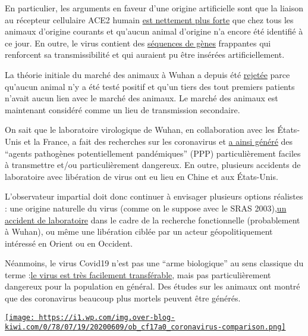 En particulier, les arguments en faveur d'une origine artificielle sont
que la liaison au récepteur cellulaire ACE2 humain
\href{https://arxiv.org/abs/2005.06199}{est nettement plus forte} que
chez tous les animaux d'origine courants et qu'aucun animal d'origine
n'a encore été identifié à ce jour. En outre, le virus contient des
\href{https://gmwatch.org/en/news/latest-news/19403-wuhan-and-us-scientists-used-undetectable-methods-of-genetic-engineering-on-bat-coronaviruses}{séquences
de gènes} frappantes qui renforcent sa transmissibilité et qui auraient
pu être insérées artificiellement.

La théorie initiale du marché des animaux à Wuhan a depuis été
\href{https://thebulletin.org/2020/06/did-the-sars-cov-2-virus-arise-from-a-bat-coronavirus-research-program-in-a-chinese-laboratory-very-possibly}{rejetée}
parce qu'aucun animal n'y a été testé positif et qu'un tiers des tout
premiers patients n'avait aucun lien avec le marché des animaux. Le
marché des animaux est maintenant considéré comme un lieu de
transmission secondaire.

On sait que le laboratoire virologique de Wuhan, en collaboration avec
les États-Unis et la France, a fait des recherches sur les coronavirus
et
\href{https://www.newsweek.com/dr-fauci-backed-controversial-wuhan-lab-millions-us-dollars-risky-coronavirus-research-1500741}{a
ainsi généré} des ``agents pathogènes potentiellement pandémiques''
(PPP) particulièrement faciles à transmettre et/ou particulièrement
dangereux. En outre, plusieurs accidents de laboratoire avec libération
de virus ont eu lieu en Chine et aux États-Unis.

L'observateur impartial doit donc continuer à envisager plusieurs
options réalistes : une origine naturelle du virus (comme on le suppose
avec le SRAS 2003),\href{https://project-evidence.github.io/}{un
accident de laboratoire} dans le cadre de la recherche fonctionnelle
(probablement à Wuhan), ou même une libération ciblée par un acteur
géopolitiquement intéressé en Orient ou en Occident.

Néanmoins, le virus Covid19 n'est pas une ``arme biologique'' au sens
classique du terme
:\href{https://leelabvirus.host/covid19/origins-part2}{le virus est très
facilement transférable}, mais pas particulièrement dangereux pour la
population en général. Des études sur les animaux ont montré que des
coronavirus beaucoup plus mortels peuvent être générés.

\href{http://img.over-blog-kiwi.com/0/78/07/19/20200609/ob_cf17a0_coronavirus-comparison.png\#width=1132\&height=637}{\texttt{[image: https://i1.wp.com/img.over-blog-kiwi.com/0/78/07/19/20200609/ob\_cf17a0\_coronavirus-comparison.png]}}

